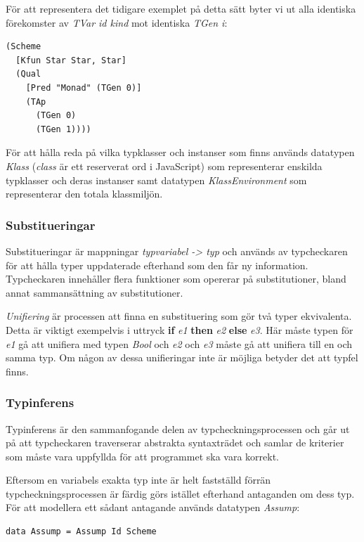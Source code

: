 För att representera det tidigare exemplet på detta sätt byter vi ut alla identiska förekomster av \emph{TVar id kind} mot identiska \emph{TGen i}:
\begin{lstlisting}
(Scheme
  [Kfun Star Star, Star]
  (Qual
    [Pred "Monad" (TGen 0)]
    (TAp
      (TGen 0)
      (TGen 1))))
\end{lstlisting}

För att hålla reda på vilka typklasser och instanser som finns används datatypen \emph{Klass} (\emph{class} är ett reserverat ord i JavaScript) som representerar enskilda typklasser och deras instanser samt datatypen \emph{KlassEnvironment} som representerar den totala klassmiljön.


\subsubsection{Substitueringar}
Substitueringar är mappningar \emph{typvariabel -> typ} och används av typcheckaren
för att hålla typer uppdaterade efterhand som den får ny
information. Typcheckaren innehåller flera funktioner som opererar på
substitutioner, bland annat sammansättning av substitutioner.  %

\emph{Unifiering} är processen att finna en substituering som gör två typer ekvivalenta. Detta är viktigt exempelvis i uttryck {\bf if} \emph{e1} {\bf then} \emph{e2} {\bf else} \emph{e3}. Här måste typen för \emph{e1} gå att unifiera med typen \emph{Bool} och \emph{e2} och \emph{e3} måste gå att unifiera till en och samma typ. Om någon av dessa unifieringar inte är möjliga betyder det att typfel finns.

\subsubsection{Typinferens}
Typinferens är den sammanfogande delen av typcheckningsprocessen och går ut på att typcheckaren traverserar abstrakta syntaxträdet och samlar de kriterier som måste vara uppfyllda för att programmet ska vara korrekt.

Eftersom en variabels exakta typ inte är helt fastställd förrän typcheckningsprocessen är färdig görs istället efterhand antaganden om dess typ. För att modellera ett sådant antagande används datatypen \emph{Assump}:
\begin{lstlisting}
data Assump = Assump Id Scheme
\end{lstlisting}

